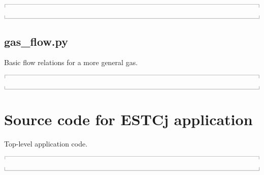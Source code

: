 \documentclass[10pt,a4paper]{article}
\newcommand{\topbar}{\ensuremath{
    \rule{0.1mm}{2.0mm} \rule[2.0mm]{159.5mm}{0.1mm} \rule{0.1mm}{2.0mm}
}}
\newcommand{\bottombar}{\ensuremath{
    \rule{0.1mm}{2.0mm} \rule{159.5mm}{0.1mm} \rule{0.1mm}{2.0mm}
}}
\begin{document}
\noindent\topbar

\bottombar

\newpage
\subsection{gas\_flow.py}
\label{gas-flow-py}
%
Basic flow relations for a more general gas.

\noindent\topbar

\bottombar

\newpage
\section{Source code for ESTCj application}
\label{estcj-py}
%
Top-level application code.

\noindent\topbar

\bottombar
\end{document}
